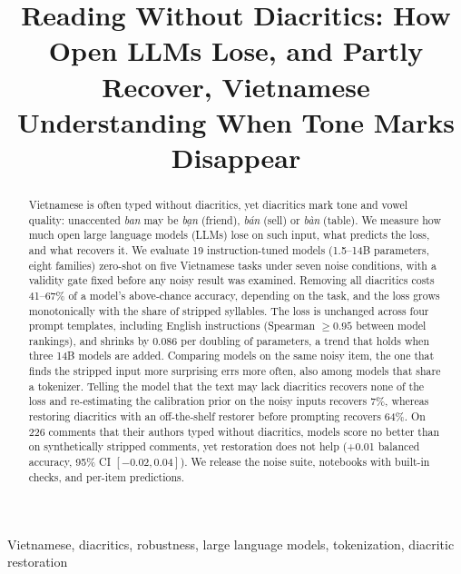 \documentclass[conference]{IEEEtran}
\newcommand{\vi}[1]{{\fontencoding{T5}\selectfont #1}}
\begin{document}
\title{Reading Without Diacritics: How Open LLMs Lose, and Partly Recover, Vietnamese Understanding When Tone Marks Disappear}

\author{
}

\maketitle

\begin{abstract}
Vietnamese is often typed without diacritics, yet diacritics mark tone and vowel quality: unaccented \textit{ban} may be \vi{\textit{bạn}} (friend), \vi{\textit{bán}} (sell) or \vi{\textit{bàn}} (table). We measure how much open large language models (LLMs) lose on such input, what predicts the loss, and what recovers it. We evaluate 19 instruction-tuned models (1.5--14B parameters, eight families) zero-shot on five Vietnamese tasks under seven noise conditions, with a validity gate fixed before any noisy result was examined. Removing all diacritics costs 41--67\% of a model's above-chance accuracy, depending on the task, and the loss grows monotonically with the share of stripped syllables. The loss is unchanged across four prompt templates, including English instructions (Spearman $\geq 0.95$ between model rankings), and shrinks by 0.086 per doubling of parameters, a trend that holds when three 14B models are added. Comparing models on the same noisy item, the one that finds the stripped input more surprising errs more often, also among models that share a tokenizer. Telling the model that the text may lack diacritics recovers none of the loss and re-estimating the calibration prior on the noisy inputs recovers 7\%, whereas restoring diacritics with an off-the-shelf restorer before prompting recovers 64\%. On 226 comments that their authors typed without diacritics, models score no better than on synthetically stripped comments, yet restoration does not help (+0.01 balanced accuracy, 95\% CI $[-0.02, 0.04]$). We release the noise suite, notebooks with built-in checks, and per-item predictions.
\end{abstract}

\begin{IEEEkeywords}
Vietnamese, diacritics, robustness, large language models, tokenization, diacritic restoration
\end{IEEEkeywords}

\end{document}
